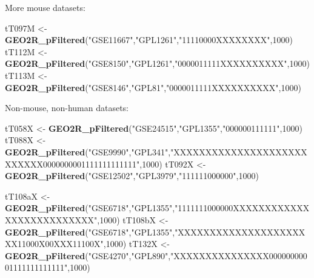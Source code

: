 \documentclass[
]{article}
\newenvironment{Shaded}{\begin{snugshade}}{\end{snugshade}}
\newcommand{\DecValTok}[1]{\textcolor[rgb]{0.00,0.00,0.81}{#1}}
\newcommand{\KeywordTok}[1]{\textcolor[rgb]{0.13,0.29,0.53}{\textbf{#1}}}
\newcommand{\NormalTok}[1]{#1}
\newcommand{\StringTok}[1]{\textcolor[rgb]{0.31,0.60,0.02}{#1}}
\begin{document}
More mouse datasets:

\begin{Shaded}
\begin{Highlighting}[]
\NormalTok{tT097M <-}\StringTok{ }\KeywordTok{GEO2R_pFiltered}\NormalTok{(}\StringTok{"GSE11667"}\NormalTok{,}\StringTok{"GPL1261"}\NormalTok{,}\StringTok{"11110000XXXXXXXX"}\NormalTok{,}\DecValTok{1000}\NormalTok{)}
\NormalTok{tT112M <-}\StringTok{ }\KeywordTok{GEO2R_pFiltered}\NormalTok{(}\StringTok{"GSE8150"}\NormalTok{,}\StringTok{"GPL1261"}\NormalTok{,}\StringTok{"0000011111XXXXXXXXXX"}\NormalTok{,}\DecValTok{1000}\NormalTok{)}
\NormalTok{tT113M <-}\StringTok{ }\KeywordTok{GEO2R_pFiltered}\NormalTok{(}\StringTok{"GSE8146"}\NormalTok{,}\StringTok{"GPL81"}\NormalTok{,}\StringTok{"0000011111XXXXXXXXXX"}\NormalTok{,}\DecValTok{1000}\NormalTok{)}
\end{Highlighting}
\end{Shaded}

Non-mouse, non-human datasets:

\begin{Shaded}
\begin{Highlighting}[]
\NormalTok{tT058X <-}\StringTok{ }\KeywordTok{GEO2R_pFiltered}\NormalTok{(}\StringTok{"GSE24515"}\NormalTok{,}\StringTok{"GPL1355"}\NormalTok{,}\StringTok{"000000111111"}\NormalTok{,}\DecValTok{1000}\NormalTok{)}
\NormalTok{tT088X <-}\StringTok{ }\KeywordTok{GEO2R_pFiltered}\NormalTok{(}\StringTok{"GSE9990"}\NormalTok{,}\StringTok{"GPL341"}\NormalTok{,}\StringTok{"XXXXXXXXXXXXXXXXXXXXXXXXXXX0000000001111111111111"}\NormalTok{,}\DecValTok{1000}\NormalTok{)}
\NormalTok{tT092X <-}\StringTok{ }\KeywordTok{GEO2R_pFiltered}\NormalTok{(}\StringTok{"GSE12502"}\NormalTok{,}\StringTok{"GPL3979"}\NormalTok{,}\StringTok{"111111000000"}\NormalTok{,}\DecValTok{1000}\NormalTok{)}

\NormalTok{tT108aX <-}\StringTok{ }\KeywordTok{GEO2R_pFiltered}\NormalTok{(}\StringTok{"GSE6718"}\NormalTok{,}\StringTok{"GPL1355"}\NormalTok{,}\StringTok{"1111111000000XXXXXXXXXXXXXXXXXXXXXXXXXX"}\NormalTok{,}\DecValTok{1000}\NormalTok{)}
\NormalTok{tT108bX <-}\StringTok{ }\KeywordTok{GEO2R_pFiltered}\NormalTok{(}\StringTok{"GSE6718"}\NormalTok{,}\StringTok{"GPL1355"}\NormalTok{,}\StringTok{"XXXXXXXXXXXXXXXXXXXXXX11000X00XXX11100X"}\NormalTok{,}\DecValTok{1000}\NormalTok{)}
\NormalTok{tT132X <-}\StringTok{ }\KeywordTok{GEO2R_pFiltered}\NormalTok{(}\StringTok{"GSE4270"}\NormalTok{,}\StringTok{"GPL890"}\NormalTok{,}\StringTok{"XXXXXXXXXXXXXXX00000000001111111111111"}\NormalTok{,}\DecValTok{1000}\NormalTok{)}
\end{Highlighting}
\end{Shaded}
\end{document}
